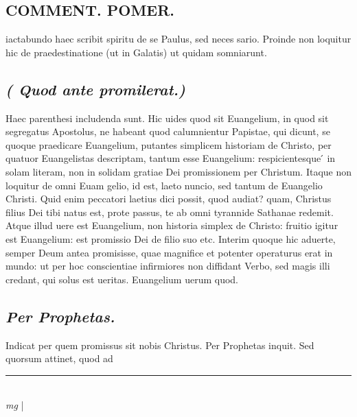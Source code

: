 \documentclass{article}
\begin{document}
\begin{pages}
\section*{COMMENT. POMER.  }\pstart iactabundo haec scribit spiritu de se Paulus, sed neces sario. Proinde non loquitur hic de praedestinatione (ut in Galatis) ut quidam somniarunt.  \pend
{}
{}
\subsection*{\textit{( Quod ante promilerat.) }}\pstart Haec parenthesi includenda sunt. Hic uides quod sit Euangelium, in quod sit segregatus Apostolus, ne habeant quod calumnientur Papistae, qui dicunt, se quoque praedicare Euangelium, putantes simplicem historiam de Christo, per quatuor Euangelistas descriptam, tantum esse Euangelium: respicientesque ́ in solam literam, non in solidam gratiae Dei promissionem per Christum. Itaque non loquitur de omni Euam gelio, id est, laeto nuncio, sed tantum de Euangelio Christi. Quid enim peccatori laetius dici possit, quod audiat? quam, Christus filius Dei tibi natus est, prote passus, te ab omni tyrannide Sathanae redemit.  Atque illud uere est Euangelium, non historia simplex de Christo: fruitio igitur est Euangelium: est promissio Dei de filio suo etc. Interim quoque hic aduerte, semper Deum antea promisisse, quae magnifice et potenter operaturus erat in mundo: ut per hoc conscientiae infirmiores non diffidant Verbo, sed magis illi credant, qui solus est ueritas.  Euangelium uerum quod.   \pend
{}
{}
\subsection*{\textit{Per Prophetas. }}\pstart Indicat per quem promissus sit nobis Christus.  Per Prophetas inquit. Sed quorsum attinet, quod ad  \pend
\vspace{0.5cm}\noindent
\vspace{0.2cm}\rule{1cm}{0.2pt}\\ 
\hspace{0.2cm}\textit{mg}
\footnotesize 
\normalsize| 

\end{pages}
\end{document}
